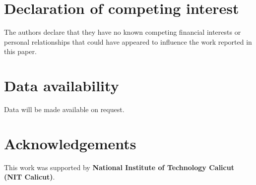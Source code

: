 \documentclass[manuscript,screen]{acmart}
\begin{document}
	
	\section*{Declaration of competing interest}
	The authors declare that they have no known competing financial interests or personal relationships 
	that could have appeared to influence the work reported in this paper.
	
	\section*{Data availability}
	Data will be made available on request.
	
	\section*{Acknowledgements}
	This work was supported by \textbf{National Institute of Technology Calicut (NIT Calicut)}.
	
	
	\appendix
	

	
	
	
	
\end{document}
